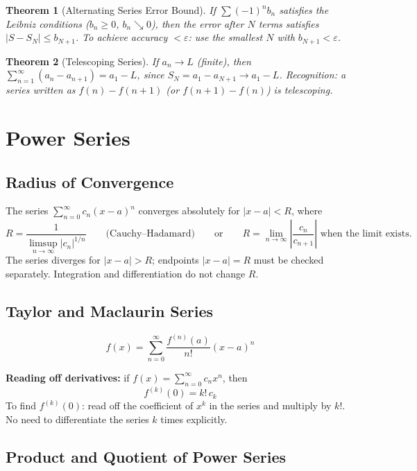 \documentclass[12pt, a4paper]{article}
\newtheorem{theorem}{Theorem}[section]
\theoremstyle{definition}
\theoremstyle{remark}
\begin{document}
\begin{theorem}[Alternating Series Error Bound]
If $\sum(-1)^n b_n$ satisfies the Leibniz conditions ($b_n \ge 0$, $b_n \searrow 0$), then
the error after $N$ terms satisfies $|S - S_N| \le b_{N+1}$.
To achieve accuracy $<\varepsilon$: use the smallest $N$ with $b_{N+1} < \varepsilon$.
\end{theorem}

\begin{theorem}[Telescoping Series]
If $a_n \to L$ (finite), then $\displaystyle\sum_{n=1}^\infty (a_n - a_{n+1}) = a_1 - L$,
since $S_N = a_1 - a_{N+1} \to a_1 - L$.
Recognition: a series written as $f(n) - f(n+1)$ (or $f(n+1) - f(n)$) is telescoping.
\end{theorem}

\section{Power Series}

\subsection{Radius of Convergence}
The series $\displaystyle\sum_{n=0}^\infty c_n (x-a)^n$ converges absolutely for $|x-a| < R$, where
\[
  R = \frac{1}{\displaystyle\limsup_{n\to\infty} |c_n|^{1/n}}
  \qquad \text{(Cauchy--Hadamard)}
  \qquad \text{or} \qquad
  R = \lim_{n\to\infty} \left|\frac{c_n}{c_{n+1}}\right| \text{ when the limit exists.}
\]
The series diverges for $|x-a|>R$; endpoints $|x-a|=R$ must be checked separately.
Integration and differentiation do not change $R$.

\subsection{Taylor and Maclaurin Series}
\[
  f(x) = \sum_{n=0}^\infty \frac{f^{(n)}(a)}{n!}(x-a)^n
\]

\textbf{Reading off derivatives:} if $f(x) = \displaystyle\sum_{n=0}^\infty c_n x^n$, then
\[
  \boxed{f^{(k)}(0) = k!\, c_k}
\]
To find $f^{(k)}(0)$: read off the coefficient of $x^k$ in the series and multiply by $k!$.
No need to differentiate the series $k$ times explicitly.

\subsection{Product and Quotient of Power Series}
\end{document}

